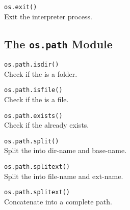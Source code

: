 \hangpar \texttt{os.exit()}\\
Exit the interpreter process.

\subsection*{The \texttt{os.path} Module}

\hangpar \texttt{os.path.isdir(}\texttt{)} \\
Check if the  is a folder.

\hangpar \texttt{os.path.isfile(}\texttt{)} \\
Check if the  is a file.

\hangpar \texttt{os.path.exists(}\texttt{)} \\
Check if the  already exists.

\hangpar \texttt{os.path.split(}\texttt{)} \\
Split the  into dir-name and base-name.

\hangpar \texttt{os.path.splitext(}\texttt{)} \\
Split the  into file-name and ext-name.

\hangpar \texttt{os.path.splitext(}\texttt{)} \\
Concatenate  into a complete path.
